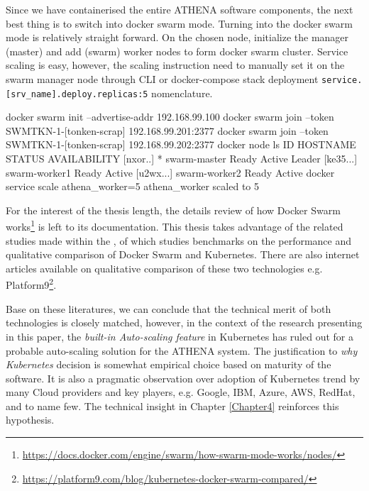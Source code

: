 Since we have containerised the entire ATHENA software components, the next best thing is to switch into docker swarm mode. Turning into the docker swarm mode is relatively straight forward. On the chosen node, initialize the manager (master) and add (swarm) worker nodes to form docker swarm cluster. Service scaling is easy, however, the scaling instruction need to manually set it on the swarm manager node through CLI or docker-compose stack deployment \verb|service.[srv_name].deploy.replicas:5| nomenclature.
\begin{small}
\begin{lcverbatim}
docker swarm init --advertise-addr 192.168.99.100
docker swarm join --token SWMTKN-1-[tonken-scrap] 192.168.99.201:2377
docker swarm join --token SWMTKN-1-[tonken-scrap] 192.168.99.202:2377
docker node ls
ID                            HOSTNAME         STATUS          AVAILABILITY
[nxor..] *   swarm-master        Ready          Active          Leader
[ke35...]    swarm-worker1       Ready          Active
[u2wx...]    swarm-worker2       Ready          Active
docker service scale athena_worker=5
athena_worker scaled to 5
\end{lcverbatim}
\end{small}

For the interest of the thesis length, the details review of how Docker Swarm works\footnote{\url{https://docs.docker.com/engine/swarm/how-swarm-mode-works/nodes/}} is left to its documentation. This thesis takes advantage of the related studies made within the \textit{\groupname}, of which studies \parencite{swarmKubeBench2} benchmarks on the performance and qualitative comparison of Docker Swarm and Kubernetes. There are also internet articles available on qualitative comparison of these two technologies e.g. Platform9\footnote{\url{https://platform9.com/blog/kubernetes-docker-swarm-compared/}}. 

Base on these literatures, we can conclude that the technical merit of both technologies is closely matched, however, in the context of the research presenting in this paper, the \emph{built-in Auto-scaling feature} in Kubernetes has ruled out for a probable auto-scaling solution for the ATHENA system. The justification to \emph{why Kubernetes} decision is somewhat empirical choice based on maturity of the software. It is also a pragmatic observation over adoption of Kubernetes trend by many Cloud providers and key players, e.g. Google, IBM, Azure, AWS, RedHat, and to name few. The technical insight in Chapter \ref{Chapter4} reinforces this hypothesis.

